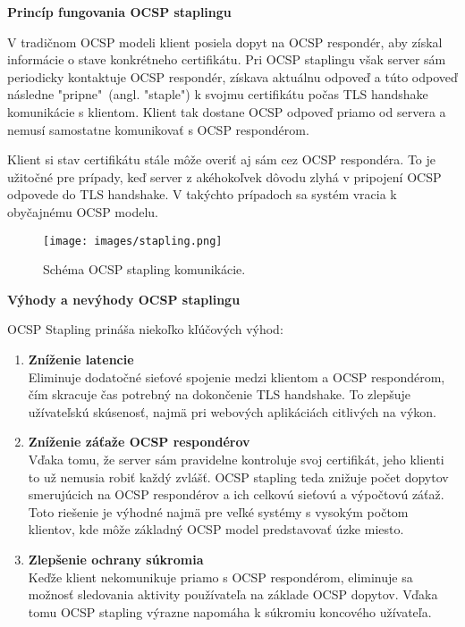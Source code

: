 \documentclass[12pt, twoside]{book}
\newcommand{\subsubsubsection}[1]{%
  \vspace{0.2em}  
  \textbf{#1} \\[0.2em]
  \hspace*{\parindent}
}
\begin{document}
\subsubsubsection{Princíp fungovania OCSP staplingu}
V tradičnom OCSP modeli klient posiela dopyt na OCSP respondér, aby získal informácie o stave konkrétneho certifikátu. Pri OCSP staplingu však server sám periodicky kontaktuje OCSP respondér, získava aktuálnu odpoveď a túto odpoveď následne "pripne"\ (angl. "staple") k svojmu certifikátu počas TLS handshake komunikácie s klientom. Klient tak dostane OCSP odpoveď priamo od servera a nemusí samostatne komunikovať s OCSP respondérom. 

Klient si stav certifikátu stále môže overiť aj sám cez OCSP respondéra. To je užitočné pre prípady, keď server z akéhokoľvek dôvodu zlyhá v pripojení OCSP odpovede do TLS handshake. V takýchto prípadoch sa systém vracia k obyčajnému OCSP modelu.

\begin{figure}[H]
\centering
\texttt{[image: images/stapling.png]}
\caption{Schéma OCSP stapling komunikácie.}
\end{figure}

\subsubsubsection{Výhody a  nevýhody OCSP staplingu}
OCSP Stapling prináša niekoľko kľúčových výhod:

\begin{enumerate}
\item \textbf{Zníženie latencie} \\
Eliminuje dodatočné sieťové spojenie medzi klientom a OCSP respondérom, čím skracuje čas potrebný na dokončenie TLS handshake. To zlepšuje užívateľskú skúsenosť, najmä pri webových aplikáciách citlivých na výkon.

\item \textbf{Zníženie záťaže OCSP respondérov} \\
Vďaka tomu, že server sám pravidelne kontroluje svoj certifikát, jeho klienti to už nemusia robiť každý zvlášť. OCSP stapling teda znižuje počet dopytov smerujúcich na OCSP respondérov a ich celkovú sieťovú a výpočtovú záťaž. Toto riešenie je výhodné najmä pre veľké systémy s vysokým počtom klientov, kde môže základný OCSP model predstavovať úzke miesto.

\item \textbf{Zlepšenie ochrany súkromia} \\
Keďže klient nekomunikuje priamo s OCSP respondérom, eliminuje sa možnosť sledovania aktivity používateľa na základe OCSP dopytov. Vďaka tomu OCSP stapling výrazne  napomáha k súkromiu koncového užívateľa.

\end{enumerate}
\end{document}
